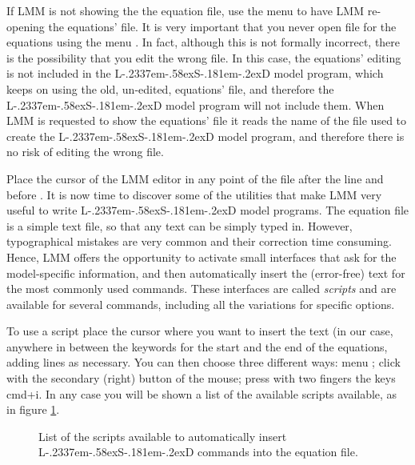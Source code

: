 \documentclass [11pt,a4paper] {book}
\def\LsD{{L\kern-.2337em\lower-.58ex\hbox{S}\kern-.181em\lower-.2ex\hbox{D}}\xspace}
\begin{document}
If LMM is not showing the the equation file, use the menu  to have LMM re-opening the equations' file. It is very important that you never open file for the equations using the menu . In fact, although this is not formally incorrect, there is the possibility that you edit the wrong file. In this case, the
equations' editing is not included in the \LsD model program, which keeps on using the old, un-edited, equations' file, and therefore the \LsD model program will not include them. When LMM is requested to show the equations' file it reads the name of the file used to create the \LsD model program, and therefore there is no risk of editing the wrong file.

Place the cursor of the LMM editor in any point of the file after the line  and before . It is now time to discover some of the utilities that make LMM very useful to write \LsD model programs. The equation file is a simple text file, so that any text can be simply typed in. However, typographical mistakes are very common and their correction time consuming. Hence, LMM offers the opportunity to activate small interfaces that ask for the model-specific information, and then automatically insert the (error-free) text for the most commonly used commands. These interfaces are called \textit{scripts} and are available for several commands, including all the variations for specific options.

To use a script place the cursor where you want to insert the text (in our case, anywhere in between the keywords for the start and the end of the equations, adding lines as necessary. You can then choose three different ways: menu ; click with the secondary (right) button of the mouse; press with two fingers the keys cmd+i. In any case you will be shown a list of the available scripts available, as in figure \ref{fig:script}.

\begin{figure}[ht]
  \centering
  \caption{List of the scripts available to automatically insert \LsD commands into the equation file.}
  \label{fig:script}
\end{figure}
\end{document}
